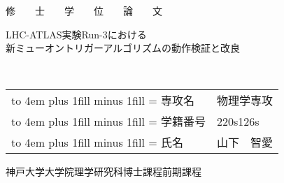 \addtocounter{page}{-3}
\thispagestyle{empty}

\vspace*{1.5cm}

\newcommand{\kintou}[2]{%
  \leavevmode
  \hbox to #1{%
    \kanjiskip=0pt plus 1fill minus 1fill
    \xkanjiskip=\kanjiskip
    #2}}

\begin{center}
  \begin{huge}
    修　　士　　学　　位　　論　　文
  \end{huge}

  \vspace{2cm}

  \begin{huge}
    \begin{spacing}{1.1}
      \fontsize{18.4pt}{20pt}\selectfont
        LHC-ATLAS実験Run-3における\\新ミューオントリガーアルゴリズムの動作検証と改良
    \end{spacing}
  \end{huge}
  
  \vspace{3cm}

  \begin{LARGE}
    \begin{spacing}{1.1}
        \flushright \submitdate\\
        \vspace{1cm}
            \begin{center}
                \begin{tabular}{p{6.5em}p{6.5em}}
                    \kintou{4em}{専攻名}   & 物理学専攻 \\
                    \kintou{4em}{学籍番号} & 220s126s   \\
                    \kintou{4em}{氏名}     & 山下　智愛 \\
                \end{tabular}                
            \end{center}
    \end{spacing}
  \end{LARGE}

  \vspace{4.0cm}

  \begin{LARGE}
    \fontsize{17pt}{20pt}\selectfont
    神戸大学大学院理学研究科博士課程前期課程
  \end{LARGE}
\end{center}